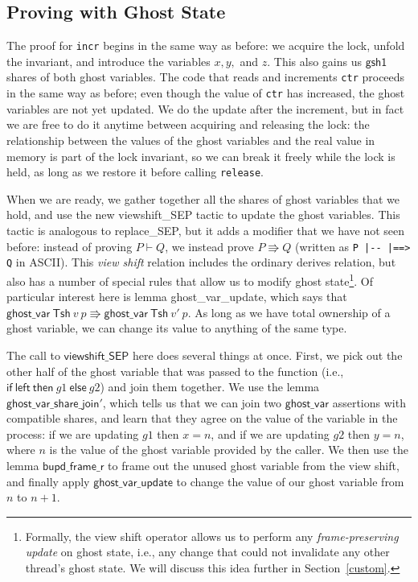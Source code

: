 \documentclass[11pt]{article} %
\begin{document}
\subsection{Proving with Ghost State}
The proof for \texttt{incr} begins in the same way as before: we acquire the lock, unfold the invariant, and introduce the variables $x, y,$ and $z$. This also gains us $\mathsf{gsh1}$ shares of both ghost variables. The code that reads and increments \texttt{ctr} proceeds in the same way as before; even though the value of \texttt{ctr} has increased, the ghost variables are not yet updated. We do the update after the increment, but in fact we are free to do it anytime between acquiring and releasing the lock: the relationship between the values of the ghost variables and the real value in memory is part of the lock invariant, so we can break it freely while the lock is held, as long as we restore it before calling \texttt{release}.

When we are ready, we gather together all the shares of ghost variables that we hold, and use the new \textsf{viewshift\_SEP} tactic to update the ghost variables. This tactic is analogous to \textsf{replace\_SEP}, but it adds a modifier that we have not seen before: instead of proving $P \vdash Q$, we instead prove $P \Rrightarrow Q$ (written as \verb+P |-- |==> Q+ in ASCII). This \emph{view shift} relation includes the ordinary derives relation, but also has a number of special rules that allow us to modify ghost state\footnote{Formally, the view shift operator allows us to perform any \emph{frame-preserving update} on ghost state, i.e., any change that could not invalidate any other thread's ghost state. We will discuss this idea further in Section~\ref{custom}.}. Of particular interest here is lemma \textsf{ghost\_var\_update}, which says that $\mathsf{ghost\_var}\ \mathsf{Tsh}\ v\ p \Rrightarrow \mathsf{ghost\_var}\ \mathsf{Tsh}\ v'\ p$. As long as we have total ownership of a ghost variable, we can change its value to anything of the same type.

The call to $\mathsf{viewshift\_SEP}$ here does several things at once. First, we pick out the other half of the ghost variable that was passed to the function (i.e., $\mathsf{if\ left\ then\ }g1\mathsf{\ else\ }g2$) and join them together. We use the lemma $\mathsf{ghost\_var\_share\_join'}$, which tells us that we can join two $\mathsf{ghost\_var}$ assertions with compatible shares, and learn that they agree on the value of the variable in the process: if we are updating $g1$ then $x = n$, and if we are updating $g2$ then $y = n$, where $n$ is the value of the ghost variable provided by the caller. We then use the lemma $\mathsf{bupd\_frame\_r}$ to frame out the unused ghost variable from the view shift, and finally apply $\mathsf{ghost\_var\_update}$ to change the value of our ghost variable from $n$ to $n + 1$.
\end{document}

